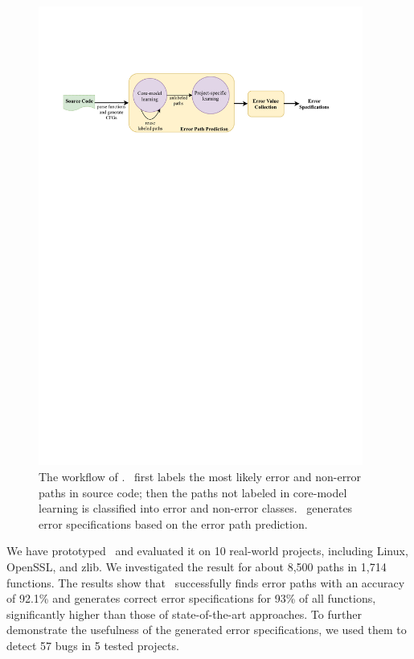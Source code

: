 \documentclass[12pt]{report}	%
\begin{document}
\begin{figure}
\includegraphics[width=0.95\textwidth]{images/errspec_arch.pdf}
\caption[The workflow of \newTool]{The workflow of \newTool.
\newTool\ first labels the most likely error and non-error paths in source code;
then the paths not labeled in core-model learning is classified into error and non-error classes.
\newTool\ generates error specifications based on the error path prediction.
 }
\label{fig:workflow}
\end{figure}

We have prototyped \newTool\ and 
evaluated it on 
10 real-world projects, including Linux, OpenSSL, 
and zlib. We investigated the result for about 
8,500 paths in 1,714 functions. 
The results show that
\newTool\ successfully finds error paths with an accuracy of 92.1\%
and generates correct error specifications for 93\% of all functions,
significantly higher than those of state-of-the-art approaches.
%
To further demonstrate the usefulness of the generated error specifications,
we used them to detect 57 bugs in 5 tested projects.
\end{document}
